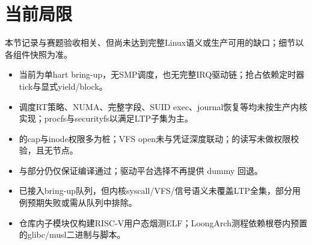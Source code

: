 \section{当前局限}

本节记录与赛题验收相关、但尚未达到完整Linux语义或生产可用的缺口；细节以各组件快照为准。

\begin{itemize}
  \item {}当前为单hart bring-up，无SMP调度，也无完整IRQ驱动链；抢占依赖定时器tick与显式yield/block。
  \item {}调度RT策略、NUMA、完整字段、SUID exec、journal恢复等均未按生产内核实现；procfs与securityfs以满足LTP子集为主。
  \item {}的cap与inode权限多为桩；VFS open未与凭证深度联动；的读写未做权限校验，且无节点。
  \item {}与部分仍仅保证编译通过；驱动平台选择不再提供 dummy 回退。
  \item {}已接入bring-up队列，但内核syscall/VFS/信号语义未覆盖LTP全集，部分用例预期失败或需从队列中排除。
  \item {}仓库内子模块仅构建RISC-V用户态烟测ELF；LoongArch测程依赖根卷内预置的glibc/musl二进制与脚本。
\end{itemize}
